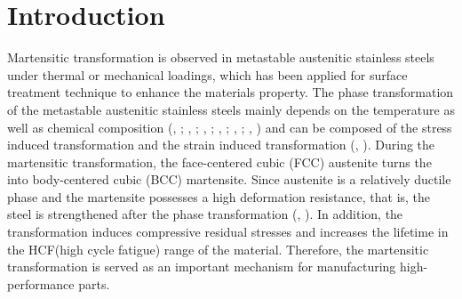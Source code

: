 \documentclass[final,5p,times,onecolumn,10pt,sort&compress]{elsarticle}
\begin{document}
\section{Introduction}
Martensitic transformation is observed in metastable austenitic stainless steels under thermal or mechanical loadings, which has been applied for surface treatment technique to enhance the materials property. The phase transformation of the metastable austenitic stainless steels mainly depends on the temperature as well as chemical composition (\citeauthor{Angel}, \citeyear{Angel}; \citeauthor{Lecroisey1972Martensitic}, \citeyear{Lecroisey1972Martensitic}; \citeauthor{Olson1975Kinetics}, \citeyear{Olson1975Kinetics}; \citeauthor{Hecker1982Effects}, \citeyear{Hecker1982Effects}; \citeauthor{Diani1998Effects}, \citeyear{Diani1998Effects}; \citeauthor{Stringfellow1992A}, \citeyear{Stringfellow1992A})
and can be composed of the stress induced transformation and the strain induced transformation (\citeauthor{Olson1975Kinetics}, \citeyear{Olson1975Kinetics}). During the martensitic transformation, the face-centered cubic (FCC) austenite turns the into body-centered cubic (BCC) martensite. Since austenite is a relatively ductile phase and the martensite possesses a high deformation resistance, that is, the steel is strengthened after the phase transformation (\citeauthor{Santacreu2006Behaviour}, \citeyear{Santacreu2006Behaviour}). In addition, the transformation induces compressive residual stresses and increases the lifetime in the HCF(high cycle fatigue) range of the material. Therefore, the martensitic transformation is served as an important mechanism for manufacturing high-performance parts.

\end{document}
